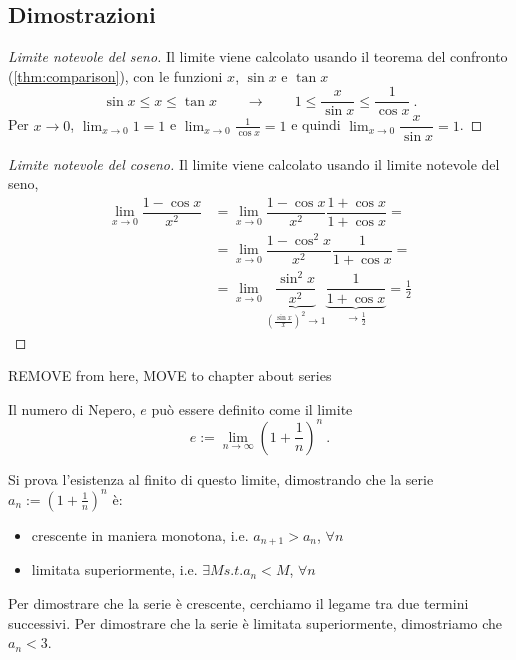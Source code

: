 \subsection{Dimostrazioni}
\begin{proof}[Limite notevole del seno] Il limite viene calcolato usando il teorema del confronto (\ref{thm:comparison}), con le funzioni $x$, $\sin x$ e $\tan x$
    \begin{equation}
        \sin x \le x \le \tan x \qquad \rightarrow \qquad 1 \le \dfrac{x}{\sin{x}} \le \dfrac{1}{\cos x} \ .
    \end{equation}
    Per $x \rightarrow 0$, $\displaystyle\lim_{x \rightarrow 0} 1 = 1$ e $\displaystyle\lim_{x \rightarrow 0} \frac{1}{\cos x} = 1$ e quindi $ \lim_{x \rightarrow 0} \dfrac{ x }{\sin x} = 1 $.
\end{proof}
\begin{proof}[Limite notevole del coseno] Il limite viene calcolato usando il limite notevole del seno,
    \begin{equation}
        \begin{aligned}
            \lim_{x \rightarrow 0} \dfrac{1 - \cos x}{x^2} 
            & = \lim_{x \rightarrow 0} \dfrac{1 - \cos x}{x^2} \dfrac{1+\cos x}{1+\cos x} = \\
            & = \lim_{x \rightarrow 0} \dfrac{1 - \cos^2 x}{x^2} \dfrac{1}{1+\cos x} = \\ 
            & = \lim_{x \rightarrow 0} \underbrace{\dfrac{\sin^2 x}{x^2}}_{\left( \frac{\sin x}{x} \right)^2 \rightarrow 1} \underbrace{\dfrac{1}{1+\cos x}}_{\rightarrow \frac{1}{2}} = \frac{1}{2}
        \end{aligned}
    \end{equation}
\end{proof}

{\color{red}
\noindent
REMOVE from here, MOVE to chapter about series
\begin{definition} Il numero di Nepero, $e$ può essere definito come il limite
    \begin{equation}
        e := \lim_{n \rightarrow \infty} \left( 1 + \dfrac{1}{n} \right)^n \ .
    \end{equation}
\end{definition}
Si prova l'esistenza al finito di questo limite, dimostrando che la serie $a_n := \left( 1 + \frac{1}{n} \right)^n $ è:
\begin{itemize}
    \item crescente in maniera monotona, i.e. $a_{n+1} > a_n$, $\forall n$
    \item limitata superiormente, i.e. $\exists M s.t. a_n < M$, $\forall n$
\end{itemize}
Per dimostrare che la serie è crescente, cerchiamo il legame tra due termini successivi.
Per dimostrare che la serie è limitata superiormente, dimostriamo che $a_n < 3$.
}

